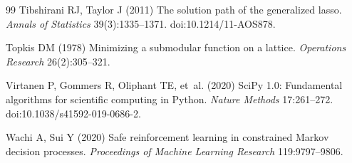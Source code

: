 \documentclass[11pt,letterpaper]{article}
\theoremstyle{definition}
\newcommand{\1}{\mathbf 1}
\begin{document}
\begin{thebibliography}{99}
Tibshirani RJ, Taylor J (2011) The solution path of the generalized lasso. \emph{Annals of Statistics} 39(3):1335--1371. doi:10.1214/11-AOS878.

Topkis DM (1978) Minimizing a submodular function on a lattice. \emph{Operations Research} 26(2):305--321.



Virtanen P, Gommers R, Oliphant TE, et~al. (2020) SciPy 1.0: Fundamental algorithms for scientific computing in Python. \emph{Nature Methods} 17:261--272. doi:10.1038/s41592-019-0686-2.

Wachi A, Sui Y (2020) Safe reinforcement learning in constrained Markov decision processes. \emph{Proceedings of Machine Learning Research} 119:9797--9806.


\end{thebibliography}
\end{document}
